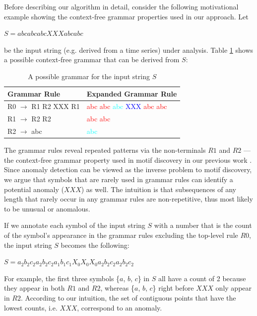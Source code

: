 \documentclass{llncs}
\begin{document}
Before describing our algorithm in detail, consider the following motivational example showing the context-free grammar properties used in our approach. Let 
\begin{center}
$S = abcabcabcXXXabcabc$
\end{center}
be the input string (e.g. derived from a time series) under analysis. Table \ref{table:rules} shows a possible context-free grammar that can be derived from $S$:
\begin{table}[h!] 
\vspace{-0.7cm}
\caption{A possible grammar for the input string $S$} 
\vspace{0.2cm}
\centering
\begin{tabularx}{\linewidth}{X X} %
\hline
Grammar Rule & Expanded Grammar Rule \\ 
\hline 
R0 $\rightarrow$ R1 R2 XXX R1 & \textcolor{red}{abc abc} \textcolor{cyan}{abc} \textcolor{blue}{XXX} \textcolor{red}{abc abc} \\ 
R1 $\rightarrow$ R2 R2 & \textcolor{red}{abc abc} \\
R2 $\rightarrow$ abc & \textcolor{cyan}{abc} \\
\hline
\end{tabularx} 
\label{table:rules} %
\vspace{-0.5cm}
\end{table} 

The grammar rules reveal repeated patterns via the non-terminals $R1$ and $R2$ --- the context-free grammar property used in motif discovery in our previous work \cite{grammarviz}. Since anomaly detection can be viewed as the inverse problem to motif discovery, we argue that symbols that are rarely used in grammar rules can identify a potential anomaly ($XXX$) as well. The intuition is that subsequences of any length that rarely occur in any grammar rules are non-repetitive, thus most likely to be unusual or anomalous.

If we annotate each symbol of the input string $S$ with a number that is the count of the symbol's appearance in the grammar rules excluding the top-level rule $R0$, the input string $S$ becomes the following:
\begin{center}
$S = a_{2}b_{2}c_{2}a_{2}b_{2}c_{2}a_{1}b_{1}c_{1}X_{0}X_{0}X_{0}a_{2}b_{2}c_{2}a_{2}b_{2}c_{2}$
\end{center}

For example, the first three symbols \{$a$, $b$, $c$\} in $S$ all have a count of 2 because they appear in both $R1$ and $R2$, whereas \{$a$, $b$, $c$\} right before $XXX$ only appear in $R2$. According to our intuition, the set of contiguous points that have the lowest counts, i.e. $XXX$,  correspond to an anomaly.
\end{document}
